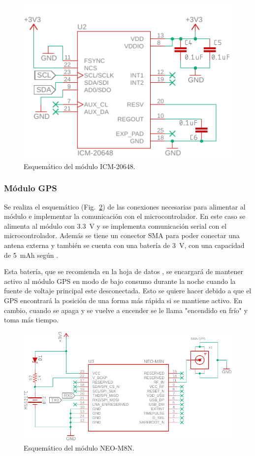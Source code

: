 \begin{figure}[htb!]
\centering
\includegraphics[width=\textwidth]{IMU_esquem.pdf}
\caption{Esquemático del módulo ICM-20648.}
\label{fig:IMU_esquem}
\end{figure}




\subsubsection{Módulo GPS}
Se realiza el esquemático (Fig.~\ref{fig:GPS_esquem}) de las conexiones necesarias para alimentar al módulo e implementar la comunicación con el microcontrolador. En este caso se alimenta al módulo con \SI{3.3}{V} y se implementa comunicación serial con el microcontrolador. Además se tiene un conector SMA para poder conectar una antena externa y también se cuenta con una batería de \SI{3}{V}, con una capacidad de \SI{5}{mAh} según \cite{MS621FE}.

Esta batería, que se recomienda en la hoja de datos \cite{GPS}, se encargará de mantener activo al módulo GPS en modo de bajo consumo durante la noche cuando la fuente de voltaje principal este desconectada. Esto se quiere hacer debido a que el GPS encontrará la posición de una forma más rápida si se mantiene activo. En cambio, cuando se apaga y se vuelve a encender se le llama "encendido en frío" y toma más tiempo.

\begin{figure}[htbp!]
\centering
\includegraphics[width=\textwidth]{GPS_esquem.pdf}
\caption{Esquemático del módulo NEO-M8N.}
\label{fig:GPS_esquem}
\end{figure}



